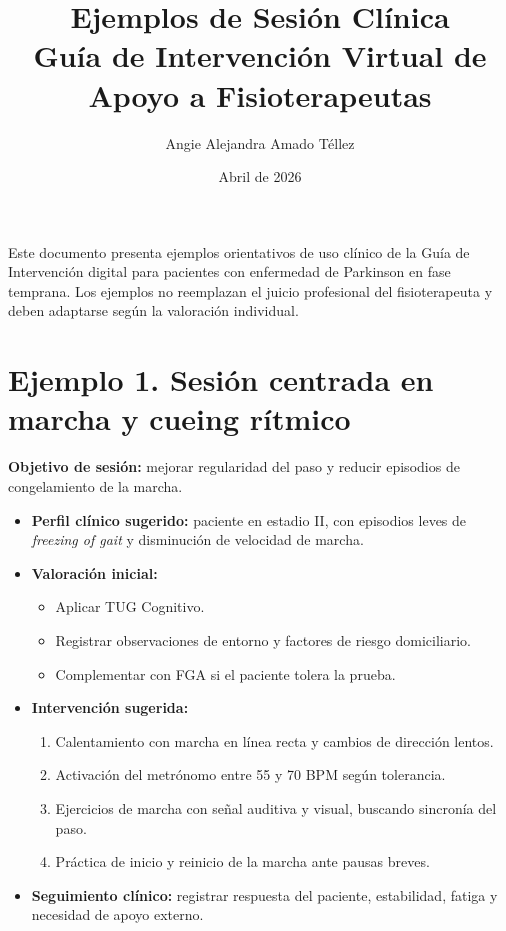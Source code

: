 \documentclass[12pt,a4paper]{article}
\title{\textbf{Ejemplos de Sesión Clínica}\\[0.2cm]\large Guía de Intervención Virtual de Apoyo a Fisioterapeutas}
\author{Angie Alejandra Amado Téllez}
\date{Abril de 2026}
\begin{document}
\maketitle

\noindent Este documento presenta ejemplos orientativos de uso clínico de la Guía de Intervención digital para pacientes con enfermedad de Parkinson en fase temprana. Los ejemplos no reemplazan el juicio profesional del fisioterapeuta y deben adaptarse según la valoración individual.

\section{Ejemplo 1. Sesión centrada en marcha y cueing rítmico}

\textbf{Objetivo de sesión:} mejorar regularidad del paso y reducir episodios de congelamiento de la marcha.

\begin{itemize}
    \item \textbf{Perfil clínico sugerido:} paciente en estadio II, con episodios leves de \textit{freezing of gait} y disminución de velocidad de marcha.
    \item \textbf{Valoración inicial:}
    \begin{itemize}
        \item Aplicar TUG Cognitivo.
        \item Registrar observaciones de entorno y factores de riesgo domiciliario.
        \item Complementar con FGA si el paciente tolera la prueba.
    \end{itemize}
    \item \textbf{Intervención sugerida:}
    \begin{enumerate}
        \item Calentamiento con marcha en línea recta y cambios de dirección lentos.
        \item Activación del metrónomo entre 55 y 70 BPM según tolerancia.
        \item Ejercicios de marcha con señal auditiva y visual, buscando sincronía del paso.
        \item Práctica de inicio y reinicio de la marcha ante pausas breves.
    \end{enumerate}
    \item \textbf{Seguimiento clínico:} registrar respuesta del paciente, estabilidad, fatiga y necesidad de apoyo externo.
\end{itemize}
\end{document}
